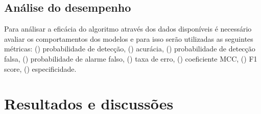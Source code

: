 \documentclass[12pt]{article}
\begin{document}
\subsection{Análise do desempenho}
Para análisar a eficácia do algoritmo através dos dados disponíveis é 
necessário avaliar os comportamentos dos modelos e para isso 
serão utilizadas as seguintes métricas:
() probabilidade de detecção,
() acurácia,
() probabilidade de detecção falsa,
() probabilidade de alarme falso,
() taxa de erro,
() coeficiente MCC,
() F1 score,
() especificidade.

\section{Resultados e discussões}

\end{document}
